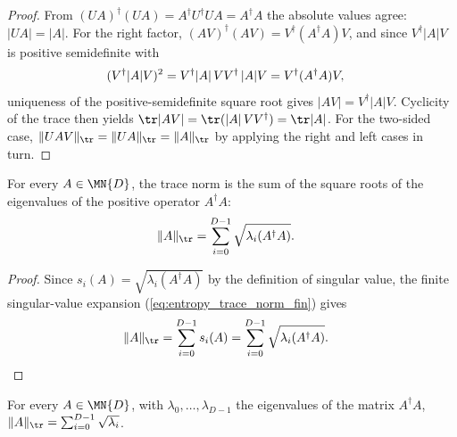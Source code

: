 \begin{proof}\leanok
    From $(UA)^\dagger(UA)=A^\dagger U^\dagger UA=A^\dagger A$ the absolute
    values agree: $\lvert UA\rvert=\lvert A\rvert$. For the right factor,
    $(AV)^\dagger(AV)=V^\dagger(A^\dagger A)V$, and since
    $V^\dagger\lvert A\rvert V$ is positive semidefinite with
    \begin{align}
        (V^\dagger\lvert A\rvert V)^2
        &=V^\dagger\lvert A\rvert\,VV^\dagger\,\lvert A\rvert V
          =V^\dagger(A^\dagger A)V,
        \notag
    \end{align}
    uniqueness of the positive-semidefinite square root gives
    $\lvert AV\rvert=V^\dagger\lvert A\rvert V$. Cyclicity of the trace then
    yields
    $\tr\lvert AV\rvert
    =\tr(\lvert A\rvert\,VV^\dagger)
    =\tr\lvert A\rvert$. For the two-sided case,
    $\lVert UAV\rVert_{\tr}
    =\lVert UA\rVert_{\tr}
    =\lVert A\rVert_{\tr}$
    by applying the right and left cases in turn.
\end{proof}

\begin{lemma}
    \label{lem:trace_norm_sqrt_eigenvalues}
    \leanok
    For every $A\in\MN{D}$, the trace norm is the sum of the square roots of
    the eigenvalues of the positive operator $A^\dagger A$:
    \begin{align}
        \lVert A\rVert_{\tr}
        &=\sum_{i=0}^{D-1}\sqrt{\lambda_i(A^\dagger A)}.
        \notag
    \end{align}
\end{lemma}

\begin{proof}\leanok
    Since $s_i(A)=\sqrt{\lambda_i(A^\dagger A)}$ by the definition of singular
    value, the finite singular-value expansion
    (\ref{eq:entropy_trace_norm_fin}) gives
    \begin{align}
        \lVert A\rVert_{\tr}
        &=\sum_{i=0}^{D-1}s_i(A)
          =\sum_{i=0}^{D-1}\sqrt{\lambda_i(A^\dagger A)}.
        \notag
    \end{align}
\end{proof}

\begin{lemma}
    \label{lem:trace_norm_sqrt_matrix_eigenvalues}
    \leanok
    For every $A\in\MN{D}$, with $\lambda_0,\ldots,\lambda_{D-1}$ the
    eigenvalues of the matrix $A^\dagger A$,
    $\lVert A\rVert_{\tr}
    =\sum_{i=0}^{D-1}\sqrt{\lambda_i}$.
\end{lemma}

